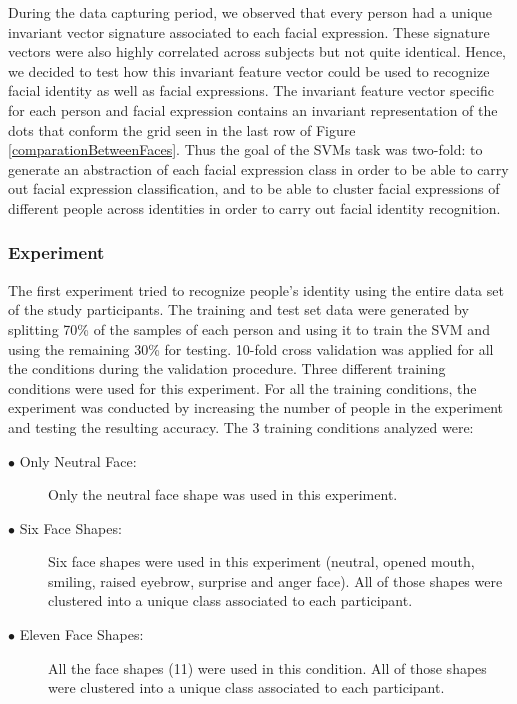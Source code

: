 \documentclass[]{article}
\begin{document}
During the data capturing period, we observed that every person had a unique invariant vector signature associated to
each facial expression. These signature vectors were also highly correlated across subjects but not quite identical.
Hence, we decided to test how this invariant feature vector could be used to recognize facial identity as well as facial
expressions. The invariant feature vector specific for each person and facial expression contains an invariant
representation of the dots that conform the grid seen in the last row of Figure
\ref{comparationBetweenFaces}. Thus the goal of the SVMs task was two-fold: to generate an abstraction of each facial
expression class in order to be able to carry out facial expression classification, and to be able to cluster facial
expressions of different people across identities in order to carry out facial identity recognition.


\subsubsection{Experiment}\label{experimentsSubsection}
The first experiment tried to recognize people's identity using the entire data set of the study participants. The
training and test set data were generated by splitting 70\% of the samples of each person and using it to train the SVM
and using the remaining 30\% for testing. 10-fold cross validation was applied for all the conditions during the
validation procedure. Three different training conditions were used for this experiment. For all the training conditions, the
experiment was conducted by increasing the number of people in the experiment and testing the resulting accuracy. The 3
training conditions analyzed were:

\begin{description}
	\item[$\bullet$ Only Neutral Face:] Only the neutral face shape was used in this
	experiment.   
	\item[$\bullet$ Six Face Shapes:] Six face shapes were used in this experiment (neutral,
	opened mouth, smiling, raised eyebrow, surprise and anger face). All of those
	shapes were clustered into a unique class associated to each
	participant. 
	\item[$\bullet$ Eleven Face Shapes:] All the face shapes (11) were used in this condition. All of those
	shapes were clustered into a unique class associated to each participant. 
\end{description}
\end{document}
